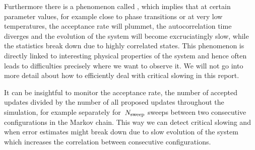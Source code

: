 Furthermore there is a phenomenon called , which
implies that at certain parameter values, for example close to phase transitions
or at very low temperatures, the acceptance rate will plummet, the
autocorrelation time diverges and the evolution of the system will become
excruciatingly slow, while the statistics break down due to highly correlated
states. This phenomenon is directly linked to interesting physical properties of
the system and hence often leads to difficulties precisely where we want to
observe it. We will not go into more detail about how to efficiently deal with
critical slowing in this report.

It can be insightful to monitor the acceptance rate, \ie{} the number of
accepted updates divided by the number of all proposed updates throughout the
simulation, for example separately for~$N_{\mathrm{sweep}}$ sweeps between two consecutive
configurations in the Markov chain. This way we can detect critical slowing and
when error estimates might break down due to slow evolution of the system which
increases the correlation between consecutive configurations.

